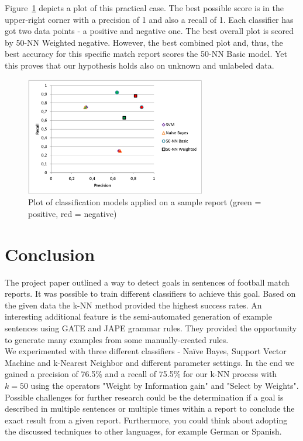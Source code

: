 \documentclass[11pt,titlepage,oneside,openany]{book}
\begin{document}
Figure~\ref{fig.plot} depicts a plot of this practical case. The best possible score is in the upper-right corner with a precision of 1 and also a recall of 1. Each classifier has got two data points - a positive and negative one. The best overall plot is scored by 50-NN Weighted negative. However, the best combined plot and, thus, the best accuracy for this specific match report scores the 50-NN Basic model. Yet this proves that our hypothesis holds also on unknown and unlabeled data.

\begin{figure} [h!]
\centering
\includegraphics[width=0.7\textwidth]{precRecall.PNG}
\caption{Plot of classification models applied on a sample report (green = positive, red = negative)}
\label{fig.plot}
\end{figure}

\section{Conclusion}
The project paper outlined a way to detect goals in sentences of football match reports. It was possible to train different classifiers to achieve this goal. Based on the given data the k-NN method provided the highest success rates. An interesting additional feature is the semi-automated generation of example sentences using GATE and JAPE grammar rules. They provided the opportunity to generate many examples from some manually-created rules.\\
We experimented with three different classifiers - Na\"{i}ve Bayes, Support Vector Machine and k-Nearest Neighbor and different parameter settings. In the end we gained a precision of 76.5\% and a recall of 75.5\% for our k-NN process with $k = 50$ using the  operators "Weight by Information gain" and "Select by Weights".\\
Possible challenges for further research could be the determination if a goal is described in multiple sentences or multiple times within a report to conclude the exact result from a given report. Furthermore, you could think about adopting the discussed techniques to other languages, for example German or Spanish. 



\end{document}
